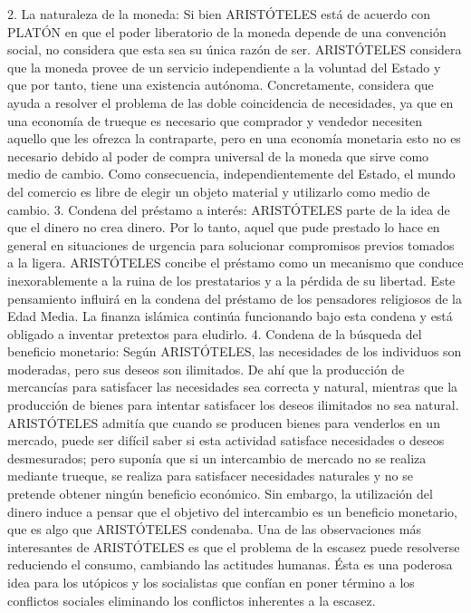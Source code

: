 \documentclass[10pt,a4paper]{article}
\begin{document}
2.
La naturaleza de la moneda: Si bien ARISTÓTELES está de acuerdo con PLATÓN en que el poder liberatorio de la moneda depende de una convención social, no considera que esta sea su única razón de ser. ARISTÓTELES considera que la moneda provee de un servicio independiente a la voluntad del Estado y que por tanto, tiene una existencia autónoma. Concretamente, considera que ayuda a resolver el problema de las doble coincidencia de necesidades, ya que en una economía de trueque es necesario que comprador y vendedor necesiten aquello que les ofrezca la contraparte, pero en una economía monetaria esto no es necesario debido al poder de compra universal de la moneda que sirve como medio de cambio. Como consecuencia, independientemente del Estado, el mundo del comercio es libre de elegir un objeto material y utilizarlo como medio de cambio.
3.
Condena del préstamo a interés: ARISTÓTELES parte de la idea de que el dinero no crea dinero. Por lo tanto, aquel que pude prestado lo hace en general en situaciones de urgencia para solucionar compromisos previos tomados a la ligera. ARISTÓTELES concibe el préstamo como un mecanismo que conduce inexorablemente a la ruina de los prestatarios y a la pérdida de su libertad. Este pensamiento influirá en la condena del préstamo de los pensadores religiosos de la Edad Media. La finanza islámica continúa funcionando bajo esta condena y está obligado a inventar pretextos para eludirlo.
4.
Condena de la búsqueda del beneficio monetario: Según ARISTÓTELES, las necesidades de los individuos son moderadas, pero sus deseos son ilimitados. De ahí que la producción de mercancías para satisfacer las necesidades sea correcta y natural, mientras que la producción de bienes para intentar satisfacer los deseos ilimitados no sea natural. ARISTÓTELES admitía que cuando se producen bienes para venderlos en un mercado, puede ser difícil saber si esta actividad satisface necesidades o deseos desmesurados; pero suponía que si un intercambio de mercado no se realiza mediante trueque, se realiza para satisfacer necesidades naturales y no se pretende obtener ningún beneficio económico. Sin embargo, la utilización del dinero induce a pensar que el objetivo del intercambio es un beneficio monetario, que es algo que ARISTÓTELES condenaba. Una de las observaciones más interesantes de ARISTÓTELES es que el problema de la escasez puede resolverse reduciendo el consumo, cambiando las actitudes humanas. Ésta es una poderosa idea para los utópicos y los socialistas que confían en poner término a los conflictos sociales eliminando los conflictos inherentes a la escasez.
\end{document}
